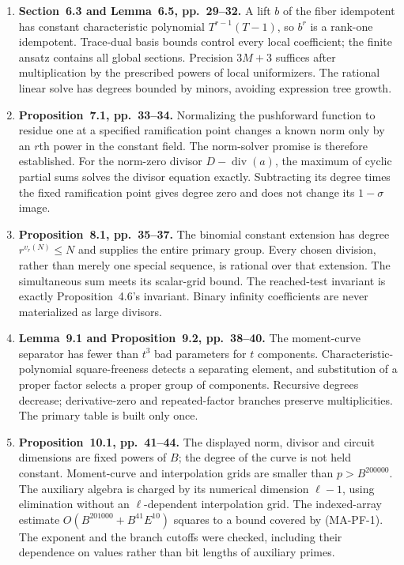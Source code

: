 \begin{enumerate}
$\operatorname{End}\mathcal V$ and have global sections as claimed.
The splitting proof is over the actual finite field. A maximal
line subbundle has quotient summand degrees no larger than its
degree, making the extension groups vanish. Evaluation gives a
full block triangular algebra. Its trace-pairing kernel is the
strictly triangular radical, whose common column kernel is the
first block; this yields the rank-one fiber idempotent by linear
algebra without diagonalizing a general algebra.
\item \textbf{Section~6.3 and Lemma~6.5, pp.~29--32.} A lift
$b$ of the fiber idempotent has constant characteristic polynomial
$T^{r-1}(T-1)$, so $b^r$ is a rank-one idempotent. Trace-dual basis
bounds control every local coefficient; the finite ansatz contains
all global sections. Precision $3M+3$ suffices after multiplication
by the prescribed powers of local uniformizers. The rational
linear solve has degrees bounded by minors, avoiding expression
tree growth.
\item \textbf{Proposition~7.1, pp.~33--34.} Normalizing the
pushforward function to residue one at a specified ramification
point changes a known norm only by an $r$th power in the constant
field. The norm-solver promise is therefore established. For the
norm-zero divisor $D-\operatorname{div}(a)$, the maximum of cyclic
partial sums solves the divisor equation exactly. Subtracting its
degree times the fixed ramification point gives degree zero and
does not change its $1-\sigma$ image.
\item \textbf{Proposition~8.1, pp.~35--37.} The binomial constant
extension has degree $r^{v_r(N)}\le N$ and supplies the entire
primary group. Every chosen division, rather than merely one
special sequence, is rational over that extension. The simultaneous
sum meets its scalar-grid bound. The reached-test invariant is
exactly Proposition~4.6's invariant. Binary infinity coefficients
are never materialized as large divisors.
\item \textbf{Lemma~9.1 and Proposition~9.2, pp.~38--40.}
The moment-curve separator has fewer than $t^3$ bad parameters
for $t$ components. Characteristic-polynomial square-freeness
detects a separating element, and substitution of a proper factor
selects a proper group of components. Recursive degrees decrease;
derivative-zero and repeated-factor branches preserve multiplicities.
The primary table is built only once.
\item \textbf{Proposition~10.1, pp.~41--44.} The displayed
norm, divisor and circuit dimensions are fixed powers of $B$;
the degree of the curve is not held constant. Moment-curve and
interpolation grids are smaller than $p>B^{200000}$. The
auxiliary algebra is charged by its numerical dimension $\ell-1$,
using elimination without an $\ell$-dependent interpolation grid.
The indexed-array estimate
$O(B^{201000}+B^{41}E^{10})$ squares to a bound covered by
(MA-PF-1). The exponent and the branch cutoffs were checked,
including their dependence on values rather than bit lengths of
auxiliary primes.
\end{enumerate}

